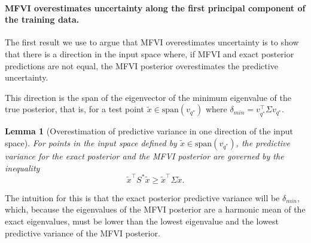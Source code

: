 \documentclass{article}
\theoremstyle{plain}
\newtheorem{lemma}[theorem]{Lemma}
\theoremstyle{definition}
\theoremstyle{remark}
\theoremstyle{plain}
\newcommand{\likelihood}{\sigma^2}
\newcommand{\prior}{\alpha^{-1} \mathbb{I}}
\newcommand{\precisionprior}{\alpha \mathbb{I}}
\newcommand{\posterior}{\Sigma}
\begin{document}
\paragraph{MFVI overestimates uncertainty along the first principal component of the training data.} The first result we use to argue that MFVI overestimates uncertainty is to show that there is a direction in the input space where, if MFVI and exact posterior predictions are not equal, the MFVI posterior overestimates the predictive uncertainty. 

This direction is the span of the eigenvector of the minimum eigenvalue of the true posterior, that is, for a test point  $\tilde x \in \text{span}(v_{q^*})$ where $\delta_{min} = v_{q^*}^\top \posterior v_{q^*}$. 
\begin{lemma}
[Overestimation of predictive variance in one direction of the input space]
\label{th:underconfident-pc}
For points in the input space defined by $ \tilde x \in \text{span}(v_{q^*})$, the predictive variance for the exact posterior and the MFVI posterior are governed by the inequality 
    \begin{equation}
        \tilde x ^\top S^* \tilde x  \geq \tilde x^\top \posterior \tilde x.
    \end{equation}
\end{lemma} 
The intuition for this is that the exact posterior predictive variance will be $\delta_{min}$, which, because the eigenvalues of the MFVI posterior are a harmonic mean of the exact eigenvalues, must be lower than the lowest eigenvalue and the lowest predictive variance of the MFVI posterior. 


\end{document}
